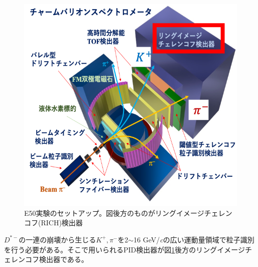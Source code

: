 \documentclass[uplatex, titlepage, dvipdfmx, 12pt, a4paper]{jsreport}
\begin{document}
\begin{figure}[htbp]
  \begin{center} 
    \includegraphics[clip, scale=0.8]{image/E50setup.png}
    \caption{E50実験のセットアップ。図後方のものがリングイメージチェレンコフ(RICH)検出器} 
    \label{fig:E50setup} 
  \end{center}
\end{figure}

$D^{*-}$の一連の崩壊から生じる$K^+, \pi^-$を2$\sim$16 GeV/{\sl c}の広い運動量領域で粒子識別を行う必要がある。そこで用いられるPID検出器が図\ref{fig:E50setup}後方のリングイメージチェレンコフ検出器である。
\end{document}
